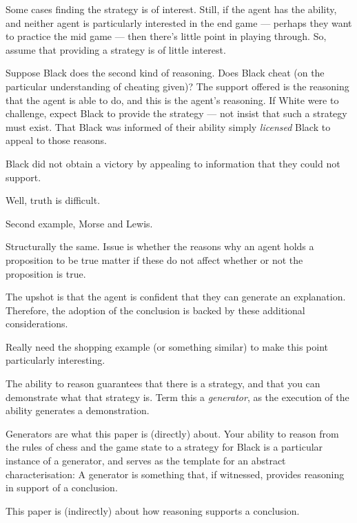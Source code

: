 \documentclass[10pt]{article}
\newcommand{\hozlinedash}[0]{%
  \noindent\hdashrule[0.5ex][c]{\textwidth}{.1pt}{2.5pt}
}
\begin{document}
\begin{note}[Why]
  Some cases finding the strategy is of interest.
  Still, if the agent has the ability, and neither agent is particularly interested in the end game --- perhaps they want to practice the mid game --- then there's little point in playing through.
  So, assume that providing a strategy is of little interest.

  Suppose Black does the second kind of reasoning.
  Does Black cheat (on the particular understanding of cheating given)?
  The support offered is the reasoning that the agent is able to do, and this is the agent's reasoning.
  If White were to challenge, expect Black to provide the strategy --- not insist that such a strategy must exist.
  That Black was informed of their ability simply \emph{licensed} Black to appeal to those reasons.

  Black did not obtain a victory by appealing to information that they could not support.

  Well, truth is difficult.

  Second example, Morse and Lewis.

  Structurally the same.
  Issue is whether the reasons why an agent holds a proposition to be true matter if these do not affect whether or not the proposition is true.
\end{note}



\hozlinedash



\begin{note}
  The upshot is that the agent is confident that they can generate an explanation.
  Therefore, the adoption of the conclusion is backed by these additional considerations.

  Really need the shopping example (or something similar) to make this point particularly interesting.

  \hozlinedash

  The ability to reason guarantees that there is a strategy, and that you can demonstrate what that strategy is.
  Term this a \emph{generator}, as the execution of the ability generates a demonstration.

  Generators are what this paper is (directly) about.
  Your ability to reason from the rules of chess and the game state to a strategy for Black is a particular instance of a generator, and serves as the template for an abstract characterisation:
  A generator is something that, if witnessed, provides reasoning in support of a conclusion.

  This paper is (indirectly) about how reasoning supports a conclusion.
\end{note}
\end{document}
